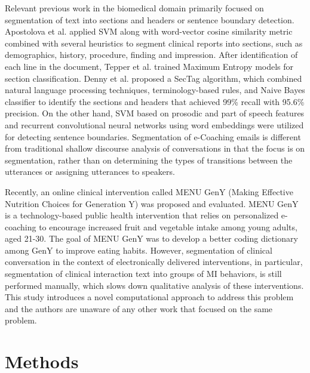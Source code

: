 \documentclass{amia}
\begin{document}
Relevant previous work in the biomedical domain primarily focused on segmentation of text into sections and headers\cite{apostolova2009automatic,denny2009evaluation,tepper2012statistical,cho2002text} or sentence boundary detection\cite{griffis2016quantitative,kreuzthaler2015detection,treviso2016sentence}. Apostolova et al.\cite{apostolova2009automatic} applied SVM along with word-vector cosine similarity metric combined with several heuristics to segment clinical reports into sections, such as demographics, history, procedure, finding and impression. After identification of each line in the document, Tepper et al. \cite{tepper2012statistical} trained Maximum Entropy models for section classification. Denny et al.\cite{denny2009evaluation} proposed a SecTag algorithm, which combined natural language processing techniques, terminology-based rules, and Naive Bayes classifier to identify the sections and headers that achieved 99\% recall with 95.6\% precision. On the other hand, SVM based on prosodic and part of speech features \cite{kreuzthaler2015detection} and recurrent convolutional neural networks using word embeddings \cite{griffis2016quantitative} were utilized for detecting sentence boundaries. Segmentation of e-Coaching emails is different from traditional shallow discourse analysis of conversations \cite{galley2003discourse} in that the focus is on segmentation, rather than on determining the types of transitions between the utterances or assigning utterances to speakers.

Recently, an online clinical intervention called MENU GenY \cite{alexander2017motivations} (Making Effective Nutrition Choices for Generation Y) was proposed and evaluated. MENU GenY is a technology-based public health intervention that relies on personalized e-coaching to encourage increased fruit and vegetable intake among young adults, aged 21-30. The goal of MENU GenY was to develop a better coding dictionary among GenY to improve eating habits. However, segmentation of clinical conversation in the context of electronically delivered interventions, in particular, segmentation of clinical interaction text into groups of MI behaviors, is still performed manually, which slows down qualitative analysis of these interventions. This study introduces a novel computational approach to address this problem and the authors are unaware of any other work that focused on the same problem.  

\section*{Methods}
\end{document}
